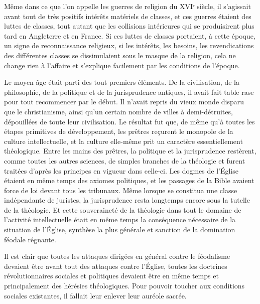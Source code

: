 \documentclass[french,twoside]{book} %
\begin{document}
Même dans ce que l’on appelle les guerres de religion du XVIᵉ siècle, il s’agissait avant tout de très positifs intérêts matériels de classes, et ces guerres étaient des luttes de classes, tout autant que les collisions intérieures qui se produisirent plus tard en Angleterre et en France. Si ces luttes de classes portaient, à cette époque, un signe de reconnaissance religieux, si les intérêts, les besoins, les revendications des différentes classes se dissimulaient sous le masque de la religion, cela ne change rien à l’affaire et s’explique facilement par les conditions de l’époque.\par
Le moyen âge était parti des tout premiers éléments. De la civilisation, de la philosophie, de la politique et de la jurisprudence antiques, il avait fait table rase pour tout recommencer par le début. Il n’avait repris du vieux monde disparu que le christianisme, ainsi qu’un certain nombre de villes à demi-détruites, dépouillées de toute leur civilisation. Le résultat fut que, de même qu’à toutes les étapes primitives de développement, les prêtres reçurent le monopole de la culture intellectuelle, et la culture elle-même prit un caractère essentiellement théologique. Entre les mains des prêtres, la politique et la jurisprudence restèrent, comme toutes les autres sciences, de simples branches de la théologie et furent traitées d’après les principes en vigueur dans celle-ci. Les dogmes de l’Église étaient en même temps des axiomes politiques, et les passages de la Bible avaient force de loi devant tous les tribunaux. Même lorsque se constitua une classe indépendante de juristes, la jurisprudence resta longtemps encore sous la tutelle de la théologie. Et cette souveraineté de la théologie dans tout le domaine de l’activité intellectuelle était en même temps la conséquence nécessaire de la situation de l’Église, synthèse la plus générale et sanction de la domination féodale régnante.\par
Il est clair que toutes les attaques dirigées en général contre le féodalisme devaient être avant tout des attaques contre l’Église, toutes les doctrines révolutionnaires sociales et politiques devaient être en même temps et principalement des hérésies théologiques. Pour pouvoir toucher aux conditions sociales existantes, il fallait leur enlever leur auréole sacrée.\par
\end{document}
